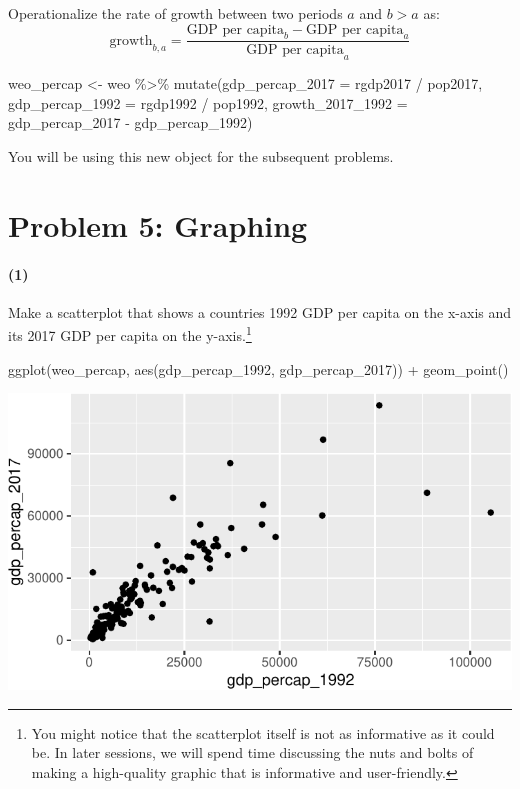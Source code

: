 \documentclass[11pt]{article}
\newenvironment{Shaded}{\begin{snugshade}}{\end{snugshade}}
\newcommand{\AttributeTok}[1]{\textcolor[rgb]{0.77,0.63,0.00}{#1}}
\newcommand{\FunctionTok}[1]{\textcolor[rgb]{0.00,0.00,0.00}{#1}}
\newcommand{\NormalTok}[1]{#1}
\newcommand{\OtherTok}[1]{\textcolor[rgb]{0.56,0.35,0.01}{#1}}
\newcommand{\SpecialCharTok}[1]{\textcolor[rgb]{0.00,0.00,0.00}{#1}}
\begin{document}
Operationalize the rate of growth between two periods \(a\) and \(b >a\)
as:
\[\text{growth}_{b, a} = \frac{\text{GDP per capita}_b - \text{GDP per capita}_a}{\text{GDP per capita}_a}\]

\begin{Shaded}
\begin{Highlighting}[]
\NormalTok{weo\_percap }\OtherTok{\textless{}{-}}\NormalTok{ weo }\SpecialCharTok{\%\textgreater{}\%}
  \FunctionTok{mutate}\NormalTok{(}\AttributeTok{gdp\_percap\_2017 =}\NormalTok{ rgdp2017 }\SpecialCharTok{/}\NormalTok{ pop2017,}
         \AttributeTok{gdp\_percap\_1992 =}\NormalTok{ rgdp1992 }\SpecialCharTok{/}\NormalTok{ pop1992,}
         \AttributeTok{growth\_2017\_1992 =}\NormalTok{ gdp\_percap\_2017 }\SpecialCharTok{{-}}\NormalTok{ gdp\_percap\_1992)}
\end{Highlighting}
\end{Shaded}

You will be using this new object for the subsequent problems.

\hypertarget{problem-5-graphing}{%
\section*{Problem 5: Graphing}\label{problem-5-graphing}}

\paragraph{(1)}

Make a scatterplot that shows a countries 1992 GDP per capita on the
x-axis and its 2017 GDP per capita on the
y-axis.\footnote{You might notice that the scatterplot itself is not as informative as it could be. In later sessions, we will spend time discussing the nuts and bolts of making a high-quality graphic that is informative and user-friendly.}

\begin{Shaded}
\begin{Highlighting}[]
\FunctionTok{ggplot}\NormalTok{(weo\_percap, }\FunctionTok{aes}\NormalTok{(gdp\_percap\_1992, gdp\_percap\_2017)) }\SpecialCharTok{+}
  \FunctionTok{geom\_point}\NormalTok{()}
\end{Highlighting}
\end{Shaded}

\includegraphics{pre-assignment_files/figure-latex/unnamed-chunk-7-1.pdf}
\end{document}
